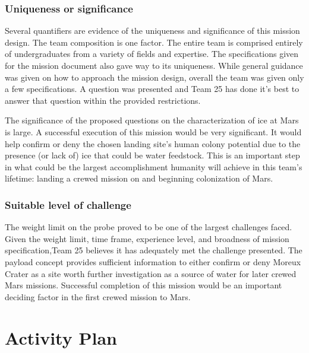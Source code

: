 \documentclass[%
 portrait,
 aapm,
 mph,%
 amsmath,amssymb,
 reprint,%
]{revtex4-2}
\begin{document}
\subsubsection{Uniqueness or significance}
Several quantifiers are evidence of the uniqueness and significance of this mission design. The team composition is one factor. The entire team is comprised entirely of undergraduates from a variety of fields and expertise. The specifications given for the mission document also gave way to its uniqueness. While general guidance was given on how to approach the mission design, overall the team was given only a few specifications. A question was presented and Team 25 has done it's best to answer that question within the provided restrictions.

The significance of the proposed questions on the characterization of ice at Mars is large. A successful execution of this mission would be very significant. It would help confirm or deny the chosen landing site's human colony potential due to the presence (or lack of) ice that could be water feedstock. This is an important step in what could be the largest accomplishment humanity will achieve in this team's lifetime: landing a crewed mission on and beginning colonization of Mars.


\subsubsection{Suitable level of challenge}
The weight limit on the probe proved to be one of the largest challenges faced. Given the weight limit, time frame, experience level, and broadness of mission specification,Team 25 believes it has adequately met the challenge presented. The payload concept provides sufficient information to either confirm or deny Moreux Crater as a site worth further investigation as a source of water for later crewed Mars missions. Successful completion of this mission would be an important deciding factor in the first crewed mission to Mars. 


\section{\label{sec:level6}Activity Plan}
\end{document}
